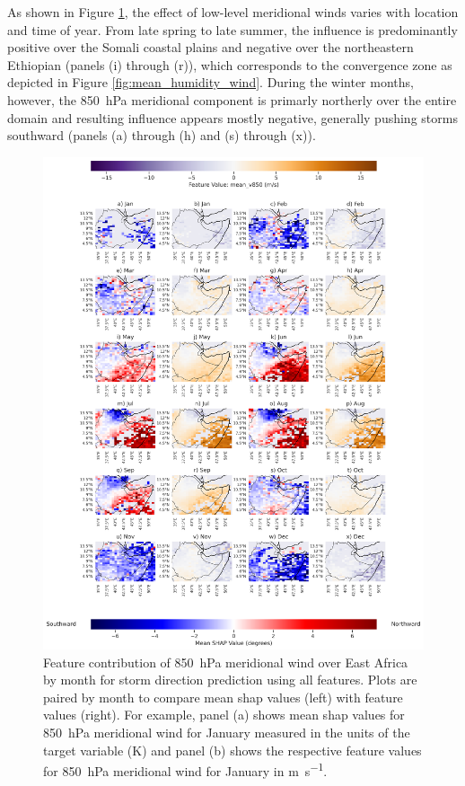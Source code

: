 As shown in Figure \ref{fig:storm_direction_all_shap_mean_v850_map_by_month}, the effect of low-level meridional winds varies with location and time of year. From late spring to late summer, the influence is predominantly positive over the Somali coastal plains and negative over the northeastern Ethiopian (panels (i) through (r)), which corresponds to the convergence zone as depicted in Figure \ref{fig:mean_humidity_wind}. During the winter months, however, the \SI{850}{\hecto\pascal} meridional component is primarly northerly over the entire domain and resulting influence appears mostly negative, generally pushing storms southward (panels (a) through (h) and (s) through (x)).

\begin{figure}[ht]
    \centering
    \includegraphics[width=\textwidth]{../figures/generated/experiments/storm_direction/geographic_corr/storm_direction_all_shap_mean_v850_map_by_month.png}
    \caption{Feature contribution of \SI{850}{\hecto\pascal} meridional wind over East Africa by month for storm direction prediction using all features. Plots are paired by month to compare mean \acrshort{shap} values (left) with feature values (right). For example, panel (a) shows mean \acrshort{shap} values for \SI{850}{\hecto\pascal} meridional wind for January measured in the units of the target variable (\unit{\kelvin}) and panel (b) shows the respective feature values for \SI{850}{\hecto\pascal} meridional wind for January in \unit{\meter\per\second}.}
    \label{fig:storm_direction_all_shap_mean_v850_map_by_month}
\end{figure}

